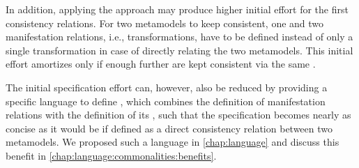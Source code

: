 In addition, applying the \commonalities approach may produce higher initial effort for the first consistency relations.
For two metamodels to keep consistent, one \conceptmetamodel and two manifestation relations, i.e., transformations, have to be defined instead of only a single transformation in case of directly relating the two metamodels.
This initial effort amortizes only if enough further \concretemetamodels are kept consistent via the same \conceptmetamodel.

The initial specification effort can, however, also be reduced by providing a specific language to define \commonalities, which combines the definition of manifestation relations with the definition of its \commonality, such that the specification becomes nearly as concise as it would be if defined as a direct consistency relation between two metamodels.
We proposed such a language in \autoref{chap:language} and discuss this benefit in \autoref{chap:language:commonalities:benefits}.




